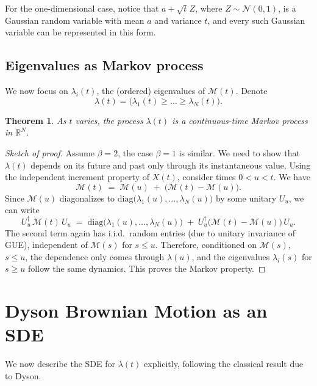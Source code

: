 \documentclass[letterpaper,11pt,oneside,reqno]{article}
\numberwithin{equation}{section}
\newcommand{\ssp}{\hspace{1pt}}
\newtheorem{theorem}[proposition]{Theorem}
\theoremstyle{definition}
\begin{document}
For the one-dimensional case, notice that $a+\sqrt t\ssp Z$, where $Z\sim \mathcal{N}(0,1)$, is a Gaussian random variable with mean $a$ and variance $t$, and every such Gaussian variable can be represented in this form.

\subsection{Eigenvalues as Markov process}
We now focus on $\lambda_i(t)$, the (ordered) eigenvalues of $\mathcal{M}(t)$. Denote
\[
\lambda(t) = \bigl(\lambda_1(t)\ge \dots \ge \lambda_N(t)\bigr).
\]
\begin{theorem}
\label{thm:lambda_is_markov}
As $t$ varies, the process $\lambda(t)$ is a continuous-time Markov process in $\mathbb{R}^N$.
\end{theorem}
\begin{proof}[Sketch of proof]
	Assume $\beta=2$, the case $\beta=1$ is similar. 
We need to show that $\lambda(t)$ depends on its future and past only through its instantaneous value. Using the independent increment property of $X(t)$, consider times $0< u< t$. We have
\[
\mathcal{M}(t) \;=\; \mathcal{M}(u)\;+\;\bigl(\mathcal{M}(t)-\mathcal{M}(u)\bigr).
\]
Since $\mathcal{M}(u)$ diagonalizes to $\mathrm{diag}\bigl(\lambda_1(u),\ldots,\lambda_N(u)\bigr)$ by some unitary $U_u$, we can write
\[
U_u^\dagger\,\mathcal{M}(t)\,U_u \;=\;\mathrm{diag}\bigl(\lambda_1(u),\ldots,\lambda_N(u)\bigr)\;+\; U_u^\dagger\bigl(\mathcal{M}(t)-\mathcal{M}(u)\bigr)\,U_u.
\]
The second term again has i.i.d.\ random entries (due to unitary invariance of 
GUE), independent of $\mathcal{M}(s)$ for $s\le u$. 
Therefore, conditioned on $\mathcal{M}(s)$, $s\le u$, the dependence only 
comes through $\lambda(u)$, and the eigenvalues $\lambda_i(s)$ for $s\ge u$ follow
the same dynamics. This proves the Markov property.
\end{proof}

\section{Dyson Brownian Motion as an SDE}
We now describe the SDE for $\lambda(t)$ explicitly, following the classical result due to Dyson.
\end{document}
